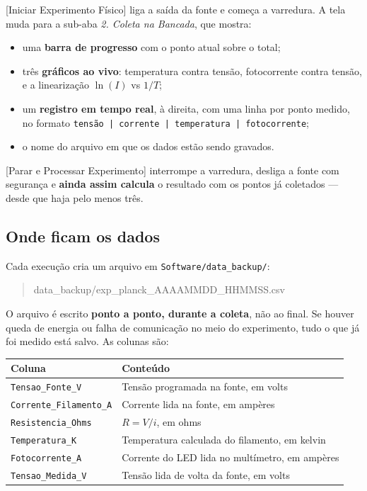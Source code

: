 \documentclass[11pt,a4paper]{article}
\newcommand{\botao}[1]{\textsf{[#1]}}
\newcommand{\campo}[1]{\textsf{\textit{#1}}}
\begin{document}
\botao{Iniciar Experimento Físico} liga a saída da fonte e começa a varredura.
A tela muda para a sub-aba \campo{2. Coleta na Bancada}, que mostra:

\begin{itemize}[nosep]
  \item uma \textbf{barra de progresso} com o ponto atual sobre o total;
  \item três \textbf{gráficos ao vivo}: temperatura contra tensão, fotocorrente
        contra tensão, e a linearização $\ln(I)$ vs $1/T$;
  \item um \textbf{registro em tempo real}, à direita, com uma linha por ponto
        medido, no formato \texttt{tensão | corrente | temperatura |
        fotocorrente};
  \item o nome do arquivo em que os dados estão sendo gravados.
\end{itemize}

\botao{Parar e Processar Experimento} interrompe a varredura, desliga a fonte
com segurança e \textbf{ainda assim calcula} o resultado com os pontos já
coletados --- desde que haja pelo menos três.

\subsection{Onde ficam os dados}

Cada execução cria um arquivo em \texttt{Software/data\_backup/}:

\begin{quote}\ttfamily
data\_backup/exp\_planck\_AAAAMMDD\_HHMMSS.csv
\end{quote}

O arquivo é escrito \textbf{ponto a ponto, durante a coleta}, não ao final.
Se houver queda de energia ou falha de comunicação no meio do experimento, tudo
o que já foi medido está salvo. As colunas são:

\begin{center}
\begin{tabular}{@{}ll@{}}
\toprule
\textbf{Coluna} & \textbf{Conteúdo} \\
\midrule
\texttt{Tensao\_Fonte\_V} & Tensão programada na fonte, em volts \\
\texttt{Corrente\_Filamento\_A} & Corrente lida na fonte, em ampères \\
\texttt{Resistencia\_Ohms} & $R = V/i$, em ohms \\
\texttt{Temperatura\_K} & Temperatura calculada do filamento, em kelvin \\
\texttt{Fotocorrente\_A} & Corrente do LED lida no multímetro, em ampères \\
\texttt{Tensao\_Medida\_V} & Tensão lida de volta da fonte, em volts \\
\bottomrule
\end{tabular}
\end{center}
\end{document}
